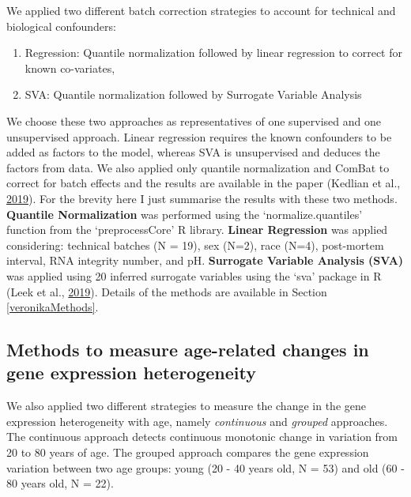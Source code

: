 \documentclass[12pt,twoside]{unicam}
\providecommand{\tightlist}{%
  \setlength{\itemsep}{0pt}\setlength{\parskip}{0pt}}
\begin{document}
We applied two different batch correction strategies to account for technical and biological confounders:

\begin{enumerate}
\def\labelenumi{\arabic{enumi}.}
\tightlist
\item
  Regression: Quantile normalization followed by linear regression to correct for known co-variates,
\item
  SVA: Quantile normalization followed by Surrogate Variable Analysis
\end{enumerate}

We choose these two approaches as representatives of one supervised and one unsupervised approach. Linear regression requires the known confounders to be added as factors to the model, whereas SVA is unsupervised and deduces the factors from data. We also applied only quantile normalization and ComBat to correct for batch effects and the results are available in the paper (Kedlian et al., \protect\hyperlink{ref-Kedlian2019}{2019}). For the brevity here I just summarise the results with these two methods. \textbf{Quantile Normalization} was performed using the `normalize.quantiles' function from the `preprocessCore' R library. \textbf{Linear Regression} was applied considering: technical batches (N = 19), sex (N=2), race (N=4), post-mortem interval, RNA integrity number, and pH. \textbf{Surrogate Variable Analysis (SVA)} was applied using 20 inferred surrogate variables using the `sva' package in R (Leek et al., \protect\hyperlink{ref-svapack}{2019}). Details of the methods are available in Section \ref{veronikaMethods}.

\hypertarget{methods-to-measure-age-related-changes-in-gene-expression-heterogeneity}{%
\subsection{Methods to measure age-related changes in gene expression heterogeneity}\label{methods-to-measure-age-related-changes-in-gene-expression-heterogeneity}}

We also applied two different strategies to measure the change in the gene expression heterogeneity with age, namely \emph{continuous} and \emph{grouped} approaches. The continuous approach detects continuous monotonic change in variation from 20 to 80 years of age. The grouped approach compares the gene expression variation between two age groups: young (20 - 40 years old, N = 53) and old (60 - 80 years old, N = 22).
\end{document}
